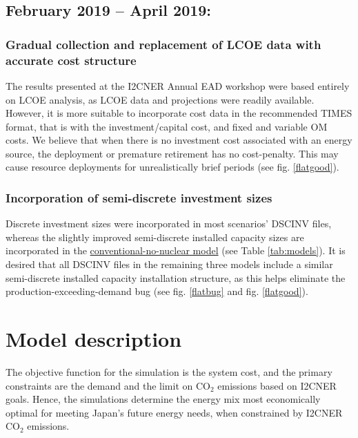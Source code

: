 \documentclass[14pt,a4paper]{article} %
\begin{document}
\subsection{February 2019 – April 2019:}

\subsubsection{Gradual collection and replacement of \gls{LCOE} data with accurate cost structure}
The results presented at the \gls{I2CNER} Annual \gls{EAD} workshop \cite{chaube_dynamic_2019} were based entirely on \gls{LCOE} analysis, as \gls{LCOE} data and projections were readily available. However, it is more suitable to incorporate cost data in the recommended \gls{TIMES} format, that is with the investment/capital cost, and fixed and variable \gls{OM} costs. We believe that when there is no investment cost associated with an energy source, the deployment or premature retirement has no cost-penalty. This may cause resource deployments for unrealistically brief periods (see fig. \ref{flatgood}).

\subsubsection{Incorporation of semi-discrete investment sizes}
Discrete investment sizes were incorporated in most scenarios' \gls{DSCINV} files\cite{gargiulo_documentation_2005}, whereas the slightly improved semi-discrete installed  capacity sizes are incorporated in the \href{https://github.com/arfc/i2cner/tree/master/JPN-Main-Model/active/co2-constrnt-conv-nonuc}{conventional-no-nuclear model} (see Table \ref{tab:models}). It is desired that all \gls{DSCINV} files in the remaining three models include a similar semi-discrete installed  capacity installation structure, as this helps eliminate the production-exceeding-demand bug (see fig. \ref{flatbug} and fig. \ref{flatgood}).

\section{Model description}

The objective function \cite{loulou_documentation_2005} for the simulation is the system cost, and the primary constraints are the demand and the limit on CO$_2$ emissions based on \gls{I2CNER} goals. Hence, the simulations determine the energy mix most economically optimal for meeting Japan's future energy needs, when constrained by \gls{I2CNER} CO$_2$ emissions.
\end{document}
